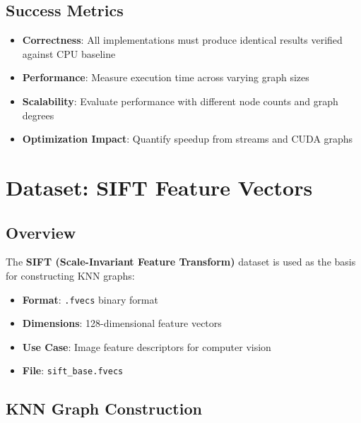 \documentclass[11pt,a4paper]{article}
\begin{document}
\subsection{Success Metrics}

\begin{itemize}
    \item \textbf{Correctness}: All implementations must produce identical results verified against CPU baseline
    \item \textbf{Performance}: Measure execution time across varying graph sizes
    \item \textbf{Scalability}: Evaluate performance with different node counts and graph degrees
    \item \textbf{Optimization Impact}: Quantify speedup from streams and CUDA graphs
\end{itemize}

\section{Dataset: SIFT Feature Vectors}

\subsection{Overview}

The \textbf{SIFT (Scale-Invariant Feature Transform)} dataset is used as the basis for constructing KNN graphs:

\begin{tcolorbox}[colback=green!5!white,colframe=green!75!black,title=SIFT Dataset Characteristics]
    \begin{itemize}
        \item \textbf{Format}: \texttt{.fvecs} binary format
        \item \textbf{Dimensions}: 128-dimensional feature vectors
        \item \textbf{Use Case}: Image feature descriptors for computer vision
        \item \textbf{File}: \texttt{sift\_base.fvecs}
    \end{itemize}
\end{tcolorbox}

\subsection{KNN Graph Construction}
\end{document}
